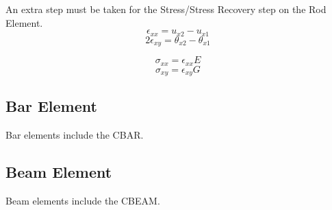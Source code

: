      An extra step must be taken for the Stress/Stress Recovery step on the Rod Element.
       \[   \epsilon_{xx} = u_{x2}-u_{x1}           \]
       \[ 2 \epsilon_{xy} = \theta_{x2}-\theta_{x1} \]

       \[ \sigma_{xx} = \epsilon_{xx} E \]
       \[ \sigma_{xy} = \epsilon_{xy} G \]

   \subsection{Bar Element}
     Bar elements include the CBAR.

   \subsection{Beam Element}
     Beam elements include the CBEAM.

